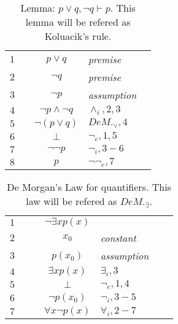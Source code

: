 \documentclass[12pt]{article}
\begin{document}
\begin{table}[H]
	\centering
	\begin{tabular}{llcll}
		$1$ & & $p \lor q$ & \textit{premise} &\\
		$2$ & & $\neg q$ & \textit{premise} & \\\cline{2-5}
		$3$ & \multicolumn{1}{|c}{} & $\neg p$ & \textit{assumption} & \multicolumn{1}{c|}{}\\
		$4$ & \multicolumn{1}{|c}{} & $\neg p\land \neg q$ & $\land _i,2,3$ & \multicolumn{1}{c|}{}\\
		$5$ & \multicolumn{1}{|c}{} & $\neg(p\lor q)$ & $DeM._\lor,4$& \multicolumn{1}{c|}{}\\
		$6$ & \multicolumn{1}{|c}{} & $\bot$ & $\neg _e,1,5$& \multicolumn{1}{c|}{}\\\cline{2-5}
		$7$ & & $\neg\neg p$ & $\neg _i,3-6$ & \\
		$8$ & & $p$ & $\neg\neg _e,7$ & \\
		
	\end{tabular}
	\caption{Lemma: $p\lor q, \neg q \vdash p$. This lemma will be refered as Koluacik's rule.}
	
\end{table}

\begin{table}[H]
	\centering
	\begin{tabular}{lllclll}
		$1$ & & & $\neg\exists xp(x)$ & & &\\\cline{2-7}
		$2$ & \multicolumn{1}{|c}{} & & $x_0$ & \textit{constant} & &\multicolumn{1}{c|}{}\\\cline{3-6}
		$3$ & \multicolumn{1}{|c}{} &\multicolumn{1}{|c}{}  & $p(x_0)$ & \textit{assumption} &\multicolumn{1}{c|}{} &\multicolumn{1}{c|}{}\\
		$4$ & \multicolumn{1}{|c}{} &\multicolumn{1}{|c}{}  & $\exists xp(x)$ & $\exists _i,3$&\multicolumn{1}{c|}{} &\multicolumn{1}{c|}{}\\
		$5$ & \multicolumn{1}{|c}{} &\multicolumn{1}{|c}{}  & $\bot$ & $\neg _e,1,4$ &\multicolumn{1}{c|}{} &\multicolumn{1}{c|}{}\\\cline{3-6}
		$6$ & \multicolumn{1}{|c}{} & & $\neg p(x_0)$ & $\neg _i,3-5$ & &\multicolumn{1}{c|}{}\\\cline{2-7}
		$7$ & & & $\forall x\neg p(x)$ & $\forall _i,2-7$ & &\\
		
	\end{tabular}
	\caption{De Morgan's Law for quantifiers. This law will be refered as $DeM._\exists$.}
\end{table}
\end{document}
